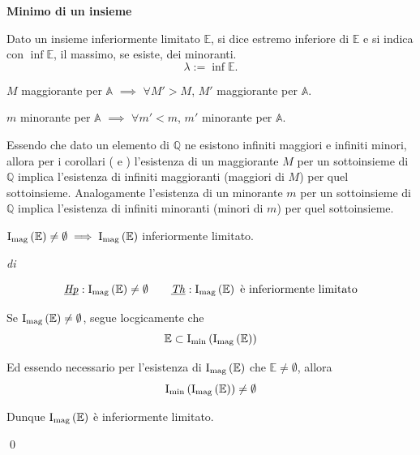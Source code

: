 \begin{definition}
    \textbf{Minimo di un insieme}
    
    Dato un insieme inferiormente limitato $\mathbb{E}$, si dice estremo inferiore di $\mathbb{E}$ e
    si indica con $\inf \mathbb{E}$, il massimo, se esiste, dei minoranti.
    \[
        \lambda := \inf\mathbb{E}.
    \]
\end{definition}

\begin{corollary}
    \label{cor:inf-mag}
    $M$ maggiorante per $\mathbb{A}$ $\implies$ $\forall M' > M$, $M'$ maggiorante per $\mathbb{A}$.
\end{corollary}
\begin{corollary}
    \label{cor:inf-min}
    $m$ minorante per $\mathbb{A}$ $\implies$ $\forall m' < m$, $m'$ minorante per $\mathbb{A}$.
\end{corollary}

Essendo che dato un elemento di $\mathbb{Q}$ ne esistono infiniti maggiori e infiniti minori, allora
per i corollari ( e ) l'esistenza di un maggiorante $M$ per un sottoinsieme
di $\mathbb{Q}$ implica l'esistenza di infiniti maggioranti (maggiori di $M$) per quel sottoinsieme. Analogamente
l'esistenza di un minorante $m$ per un sottoinsieme di $\mathbb{Q}$ implica l'esistenza di infiniti minoranti
(minori di $m$) per quel sottoinsieme.



\begin{corollary}
    \label{cor:mag-inf-lim}
    $\operatorname{I_{mag}\left(\mathbb{E}\right)} \neq\emptyset \implies \operatorname{I_{mag}\left(\mathbb{E}\right)}$ inferiormente limitato.
\end{corollary}
\begin{demonstration}
    \textit{di} 

    \[\underbar{\textit{Hp}}: \operatorname{I_{mag}\left(\mathbb{E}\right)} \neq\emptyset \qquad \underbar{\textit{Th}}: \operatorname{I_{mag}\left(\mathbb{E}\right)} \text{ è inferiormente limitato}\]

    \begin{list_2}
        \item Se $\operatorname{I_{mag}\left(\mathbb{E}\right)} \neq\emptyset$, segue locgicamente che
            \[ \mathbb{E}\subset \operatorname{I_{min}\left(\operatorname{I_{mag}\left(\mathbb{E}\right)}\right)} \]
        \item Ed essendo necessario per l'esistenza di $\operatorname{I_{mag}\left(\mathbb{E}\right)}$ che $\mathbb{E} \neq\emptyset$, allora
            \[ \operatorname{I_{min}\left(\operatorname{I_{mag}\left(\mathbb{E}\right)}\right)} \neq\emptyset\]
        \item Dunque $\operatorname{I_{mag}\left(\mathbb{E}\right)}$ è inferiormente limitato.
    \end{list_2}
    \qed
\end{demonstration}


